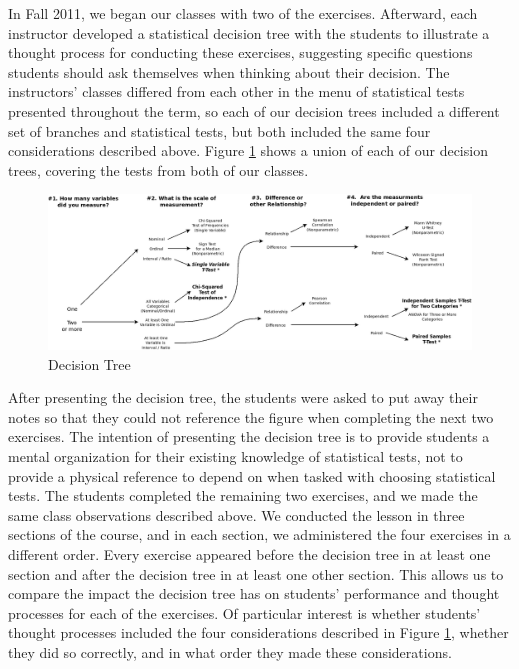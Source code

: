 \documentclass[12pt]{article}
\begin{document}
In Fall 2011, we began our classes with two of the exercises.  Afterward, each instructor developed a statistical decision tree with the students to illustrate a thought process for conducting these exercises, suggesting specific questions students should ask themselves when thinking about their decision.  The instructors' classes differed from each other in the menu of statistical tests presented throughout the term, so each of our decision trees included a different set of branches and statistical tests, but both included the same four considerations described above.  Figure \ref{fg:tree} shows a union of each of our decision trees, covering the tests from both of our classes.  

\begin{figure}\caption{Decision Tree}\label{fg:tree}
\vspace*{2pc}
\includegraphics[scale=0.37]{./decisiontree.png}
\end{figure}

After presenting the decision tree, the students were asked to put away their notes so that they could not reference the figure when completing the next two exercises.  The intention of presenting the decision tree is to provide students a mental organization for their existing knowledge of statistical tests, not to provide a physical reference to depend on when tasked with choosing statistical tests.  The students completed the remaining two exercises, and we made the same class observations described above.   We conducted the lesson in three sections of the course, and in each section, we administered the four exercises in a different order.  Every exercise appeared before the decision tree in at least one section and after the decision tree in at least one other section.  This allows us to compare the impact the decision tree has on students' performance and thought processes for each of the exercises.  Of particular interest is whether students' thought processes included the four considerations described in Figure \ref{fg:tree}, whether they did so correctly, and in what order they made these considerations.
\end{document}
